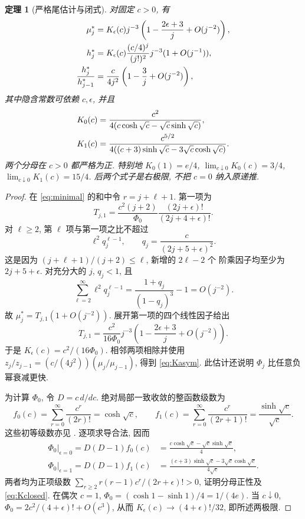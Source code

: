 \documentclass[UTF8]{ctexart}
\newtheorem{theorem}{定理}[section]
\newcommand{\eps}{\epsilon}
\begin{document}
\begin{theorem}[严格尾估计与闭式]\label{thm:K}
 对固定 $c>0$, 有
\begin{align}\label{eq:Kasym}
 \mu_j^*&=K_\eps(c)j^{-3}
  \left(1-\frac{2\eps+3}{j}+O(j^{-2})\right),\notag\\
 h_j^*&=K_\eps(c)\frac{(c/4)^j}{(j!)^2}j^{-3}(1+O(j^{-1})),\\
 \frac{h_j^*}{h_{j-1}^*}&=\frac{c}{4j^2}
  \left(1-\frac3j+O(j^{-2})\right),\notag
\end{align}
 其中隐含常数可依赖 $c,\eps$, 并且
\begin{align}\label{eq:Kclosed}
 K_0(c)&=\frac{c^2}{4(c\cosh\sqrt c-\sqrt c\sinh\sqrt c)},\notag\\
 K_1(c)&=\frac{c^{5/2}}
 {4((c+3)\sinh\sqrt c-3\sqrt c\cosh\sqrt c)}.
\end{align}
 两个分母在 $c>0$ 都严格为正. 特别地
 $K_0(1)=e/4$, $\lim_{c\downarrow0}K_0(c)=3/4$,
 $\lim_{c\downarrow0}K_1(c)=15/4$.
 后两个式子是右极限, 不把 $c=0$ 纳入原递推.
\end{theorem}
\begin{proof}
 在 \eqref{eq:minimal} 的和中令 $r=j+\ell+1$. 第一项为
\[
 T_{j,1}=\frac{c^2(j+2)}{\Phi_0}
 \frac{(2j+\eps)!}{(2j+4+\eps)!}.
\]
 对 $\ell\ge2$, 第 $\ell$ 项与第一项之比不超过
\[
 \ell^2 q_j^{\ell-1},\qquad q_j=\frac{c}{(2j+5+\eps)^2}.
\]
 这是因为 $(j+\ell+1)/(j+2)\le\ell$, 新增的 $2\ell-2$ 个
 阶乘因子均至少为 $2j+5+\eps$.
 对充分大的 $j$, $q_j<1$, 且
\[
 \sum_{\ell=2}^{\infty}\ell^2q_j^{\ell-1}
 =\frac{1+q_j}{(1-q_j)^3}-1=O(j^{-2}).
\]
 故 $\mu_j^*=T_{j,1}(1+O(j^{-2}))$.
 展开第一项的四个线性因子给出
\[
 T_{j,1}=\frac{c^2}{16\Phi_0}j^{-3}
  \left(1-\frac{2\eps+3}{j}+O(j^{-2})\right).
\]
 于是 $K_\eps(c)=c^2/(16\Phi_0)$. 相邻两项相除并使用
 $z_j/z_{j-1}=(c/(4j^2))(\mu_j/\mu_{j-1})$, 得到 \eqref{eq:Kasym}.
 此估计还说明 $\Phi_j$ 比任意负幂衰减更快.

 为计算 $\Phi_0$, 令 $D=c\,d/dc$. 绝对局部一致收敛的整函数级数为
\[
 f_0(c)=\sum_{r=0}^{\infty}\frac{c^r}{(2r)!}=\cosh\sqrt c,\qquad
 f_1(c)=\sum_{r=0}^{\infty}\frac{c^r}{(2r+1)!}=\frac{\sinh\sqrt c}{\sqrt c}.
\]
 这些初等级数亦见 \cite{dlmf}. 逐项求导合法, 因而
\begin{align*}
 \Phi_0\big|_{\eps=0}=D(D-1)f_0(c)
  &=\frac{c\cosh\sqrt c-\sqrt c\sinh\sqrt c}{4},\\
 \Phi_0\big|_{\eps=1}=D(D-1)f_1(c)
  &=\frac{(c+3)\sinh\sqrt c-3\sqrt c\cosh\sqrt c}{4\sqrt c}.
\end{align*}
 两者均为正项级数 $\sum_{r\ge2}r(r-1)c^r/(2r+\eps)!>0$,
 证明分母正性及 \eqref{eq:Kclosed}.
 在偶次 $c=1$, $\Phi_0=(\cosh1-\sinh1)/4=1/(4e)$.
 当 $c\downarrow0$, $\Phi_0=2c^2/(4+\eps)!+O(c^3)$,
 从而 $K_\eps(c)\to(4+\eps)!/32$, 即所述两极限.
\end{proof}
\end{document}
